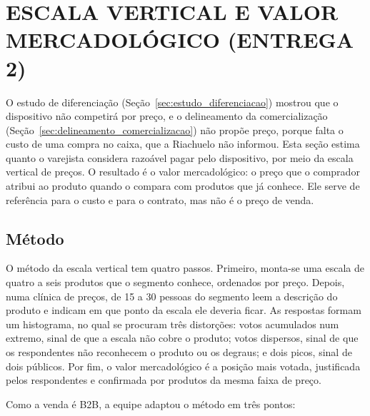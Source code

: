 
\section{ESCALA VERTICAL E VALOR MERCADOLÓGICO (ENTREGA 2)}\label{sec:escala_vertical}

O estudo de diferenciação (Seção~\ref{sec:estudo_diferenciacao}) mostrou que o dispositivo não competirá por preço, e o delineamento da comercialização (Seção~\ref{sec:delineamento_comercializacao}) não propõe preço, porque falta o custo de uma compra no caixa, que a Riachuelo não informou. Esta seção estima quanto o varejista considera razoável pagar pelo dispositivo, por meio da escala vertical de preços. O resultado é o valor mercadológico: o preço que o comprador atribui ao produto quando o compara com produtos que já conhece. Ele serve de referência para o custo e para o contrato, mas não é o preço de venda.

\subsection{Método}
\label{subsec:escala_metodo}

O método da escala vertical tem quatro passos. Primeiro, monta-se uma escala de quatro a seis produtos que o segmento conhece, ordenados por preço. Depois, numa clínica de preços, de 15 a 30 pessoas do segmento leem a descrição do produto e indicam em que ponto da escala ele deveria ficar. As respostas formam um histograma, no qual se procuram três distorções: votos acumulados num extremo, sinal de que a escala não cobre o produto; votos dispersos, sinal de que os respondentes não reconhecem o produto ou os degraus; e dois picos, sinal de dois públicos. Por fim, o valor mercadológico é a posição mais votada, justificada pelos respondentes e confirmada por produtos da mesma faixa de preço.

Como a venda é B2B, a equipe adaptou o método em três pontos:

